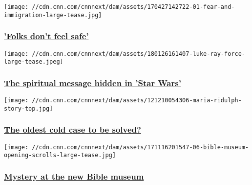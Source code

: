 \href{/2017/04/30/us/winston-salem-welcoming-city-immigration/index.html}{}

\texttt{[image: //cdn.cnn.com/cnnnext/dam/assets/170427142722-01-fear-and-immigration-large-tease.jpg]}

\hypertarget{folks-dont-feel-safe}{%
\subsubsection{\texorpdfstring{\href{/2017/04/30/us/winston-salem-welcoming-city-immigration/index.html}{'Folks
don't feel
safe'}}{'Folks don't feel safe'}}\label{folks-dont-feel-safe}}

\href{/2018/01/26/us/star-wars-religion/index.html}{}

\texttt{[image: //cdn.cnn.com/cnnnext/dam/assets/180126161407-luke-ray-force-large-tease.jpeg]}

\hypertarget{the-spiritual-message-hidden-in-star-wars-}{%
\subsubsection{\texorpdfstring{\href{/2018/01/26/us/star-wars-religion/index.html}{The
spiritual message hidden in 'Star Wars'
}}{The spiritual message hidden in 'Star Wars' }}\label{the-spiritual-message-hidden-in-star-wars-}}

\href{http://www.cnn.com/interactive/2013/08/us/oldest-cold-case/}{}

\texttt{[image: //cdn.cnn.com/cnnnext/dam/assets/121210054306-maria-ridulph-story-top.jpg]}

\hypertarget{the-oldest-cold-case-to-be-solved}{%
\subsubsection{\texorpdfstring{\href{http://www.cnn.com/interactive/2013/08/us/oldest-cold-case/}{The
oldest cold case to be
solved?}}{The oldest cold case to be solved?}}\label{the-oldest-cold-case-to-be-solved}}

\href{/2017/11/17/us/bible-museum-fakes/index.html}{}

\texttt{[image: //cdn.cnn.com/cnnnext/dam/assets/171116201547-06-bible-museum-opening-scrolls-large-tease.jpg]}

\hypertarget{mystery-at-the-new-bible-museum}{%
\subsubsection{\texorpdfstring{\href{/2017/11/17/us/bible-museum-fakes/index.html}{Mystery
at the new Bible
museum}}{Mystery at the new Bible museum}}\label{mystery-at-the-new-bible-museum}}

